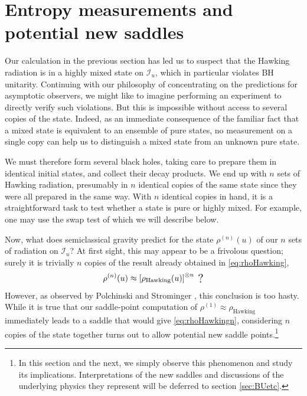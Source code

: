 \documentclass[letterpaper,12pt]{article}
\newcommand*{\scri}{\mathscr{I}} %
\begin{document}
\section{Entropy measurements and potential new saddles}
\label{sec:PS}

Our calculation in the previous section has led us to suspect that the Hawking radiation is in a highly mixed state on $\scri_u$, which in particular violates BH unitarity. Continuing with our philosophy of concentrating on the predictions for asymptotic observers, we might like to imagine performing an experiment to directly verify such violations. But this is impossible without access to several copies of the state.  Indeed, as an immediate consequence of the familiar fact that a mixed state is equivalent to an ensemble of pure states, no measurement on a single copy can help us to distinguish a mixed state from an unknown pure state.

We must therefore form several black holes, taking care to prepare them in identical initial states, and collect their decay products. We end up with $n$ sets of Hawking radiation, presumably in $n$ identical copies of the same state since they were all prepared in the same way. With $n$ identical copies in hand, it is a straightforward task to test whether a state is pure or highly mixed.  For example, one may use the swap test of \cite{buhrman2001quantum,Hayden:2007cs} which we will describe below.

Now, what does semiclassical gravity predict for the state $\rho^{(n)} (u)$ of our $n$ sets of radiation on $\scri_u$?   At first sight, this may appear to be a frivolous question; surely it is trivially $n$ copies of the result already obtained in \eqref{eq:rhoHawking},
\begin{equation}\label{eq:rhoHawkingn}
	\rho^{(n)}(u) \approx \left[\rho_\text{Hawking}(u)\right]^{\otimes n}\; \raisebox{-2pt}{\text{\Large ?}}
\end{equation}
However, as observed by Polchinski and Strominger \cite{Polchinski:1994zs}, this conclusion is too hasty.  While it is true that our saddle-point computation of $\rho^{(1)} \approx \rho_\text{Hawking}$ immediately leads to a saddle that would give \eqref{eq:rhoHawkingn},
considering $n$ copies of the state together turns out to allow potential new saddle points.\footnote{In this section and the next, we simply observe this phenomenon and study its implications.  Interpretations of the new saddles and discussions of the underlying physics they represent will be deferred to section \ref{sec:BUetc}.}
\end{document}
